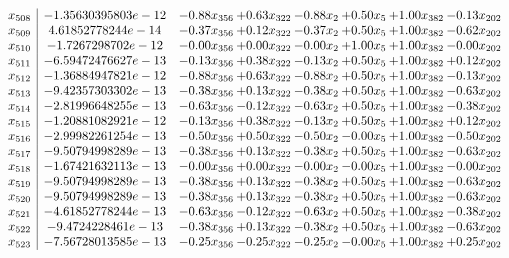 \documentclass[8pt]{article}
\begin{document}
\[\begin{array}{c| c c@{\hskip 2pt} c@{\hskip 2pt} c@{\hskip 2pt} c@{\hskip 2pt} c@{\hskip 2pt} c@{\hskip 2pt} }
 x_{508}   &  -1.35630395803e-12 & -0.88 x_{356} & +  0.63 x_{322} & -0.88 x_{2} & +  0.50 x_{5} & +  1.00 x_{382} & -0.13 x_{202}\\
 x_{509}   &  4.61852778244e-14 & -0.37 x_{356} & +  0.12 x_{322} & -0.37 x_{2} & +  0.50 x_{5} & +  1.00 x_{382} & -0.62 x_{202}\\
 x_{510}   &  -1.7267298702e-12 & -0.00 x_{356} & +  0.00 x_{322} & -0.00 x_{2} & +  1.00 x_{5} & +  1.00 x_{382} & -0.00 x_{202}\\
 x_{511}   &  -6.59472476627e-13 & -0.13 x_{356} & +  0.38 x_{322} & -0.13 x_{2} & +  0.50 x_{5} & +  1.00 x_{382} & +  0.12 x_{202}\\
 x_{512}   &  -1.36884947821e-12 & -0.88 x_{356} & +  0.63 x_{322} & -0.88 x_{2} & +  0.50 x_{5} & +  1.00 x_{382} & -0.13 x_{202}\\
 x_{513}   &  -9.42357303302e-13 & -0.38 x_{356} & +  0.13 x_{322} & -0.38 x_{2} & +  0.50 x_{5} & +  1.00 x_{382} & -0.63 x_{202}\\
 x_{514}   &  -2.81996648255e-13 & -0.63 x_{356} & -0.12 x_{322} & -0.63 x_{2} & +  0.50 x_{5} & +  1.00 x_{382} & -0.38 x_{202}\\
 x_{515}   &  -1.20881082921e-12 & -0.13 x_{356} & +  0.38 x_{322} & -0.13 x_{2} & +  0.50 x_{5} & +  1.00 x_{382} & +  0.12 x_{202}\\
 x_{516}   &  -2.99982261254e-13 & -0.50 x_{356} & +  0.50 x_{322} & -0.50 x_{2} & -0.00 x_{5} & +  1.00 x_{382} & -0.50 x_{202}\\
 x_{517}   &  -9.50794998289e-13 & -0.38 x_{356} & +  0.13 x_{322} & -0.38 x_{2} & +  0.50 x_{5} & +  1.00 x_{382} & -0.63 x_{202}\\
 x_{518}   &  -1.67421632113e-13 & -0.00 x_{356} & +  0.00 x_{322} & -0.00 x_{2} & -0.00 x_{5} & +  1.00 x_{382} & -0.00 x_{202}\\
 x_{519}   &  -9.50794998289e-13 & -0.38 x_{356} & +  0.13 x_{322} & -0.38 x_{2} & +  0.50 x_{5} & +  1.00 x_{382} & -0.63 x_{202}\\
 x_{520}   &  -9.50794998289e-13 & -0.38 x_{356} & +  0.13 x_{322} & -0.38 x_{2} & +  0.50 x_{5} & +  1.00 x_{382} & -0.63 x_{202}\\
 x_{521}   &  -4.61852778244e-13 & -0.63 x_{356} & -0.12 x_{322} & -0.63 x_{2} & +  0.50 x_{5} & +  1.00 x_{382} & -0.38 x_{202}\\
 x_{522}   &  -9.4724228461e-13 & -0.38 x_{356} & +  0.13 x_{322} & -0.38 x_{2} & +  0.50 x_{5} & +  1.00 x_{382} & -0.63 x_{202}\\
 x_{523}   &  -7.56728013585e-13 & -0.25 x_{356} & -0.25 x_{322} & -0.25 x_{2} & -0.00 x_{5} & +  1.00 x_{382} & +  0.25 x_{202}\\

\end{array}\]
\end{document}
